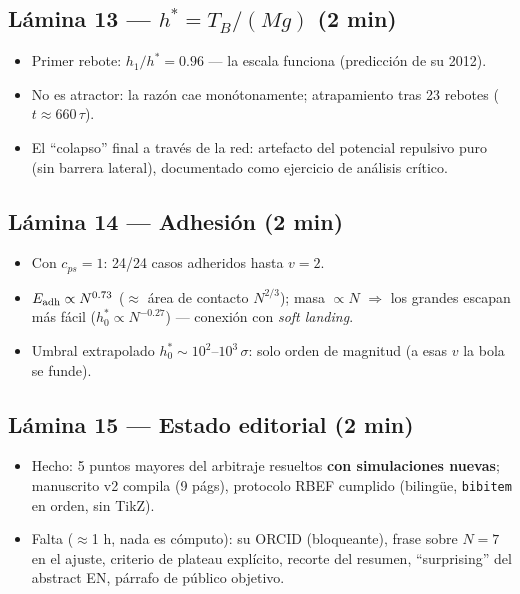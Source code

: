 \documentclass[11pt]{article}
\newcommand{\clave}[1]{\textcolor{red!60!black}{\textbf{#1}}}
\begin{document}
\subsection*{Lámina 13 --- $h^*=T_B/(Mg)$ (2 min)}
\begin{itemize}[leftmargin=1.4em]
    \item Primer rebote: $h_1/h^*=0.96$ --- la escala funciona
    (predicción de su 2012).
    \item No es atractor: la razón cae monótonamente; atrapamiento tras
    23 rebotes ($t\approx660\,\tau$).
    \item El ``colapso'' final a través de la red: artefacto del
    potencial repulsivo puro (sin barrera lateral), documentado como
    ejercicio de análisis crítico.
\end{itemize}

\subsection*{Lámina 14 --- Adhesión (2 min)}
\begin{itemize}[leftmargin=1.4em]
    \item Con $c_{ps}=1$: 24/24 casos adheridos hasta $v=2$.
    \item $E_{\rm adh}\propto N^{0.73}$ ($\approx$ área de contacto
    $N^{2/3}$); masa $\propto N$ $\Rightarrow$ los grandes escapan más
    fácil ($h_0^*\propto N^{-0.27}$) --- conexión con \emph{soft
    landing}.
    \item Umbral extrapolado $h_0^*\sim10^2$--$10^3\,\sigma$: solo orden
    de magnitud (a esas $v$ la bola se funde).
\end{itemize}

\subsection*{Lámina 15 --- Estado editorial (2 min)}
\begin{itemize}[leftmargin=1.4em]
    \item Hecho: 5 puntos mayores del arbitraje resueltos \clave{con
    simulaciones nuevas}; manuscrito v2 compila (9 págs), protocolo RBEF
    cumplido (bilingüe, \texttt{bibitem} en orden, sin TikZ).
    \item Falta ($\approx$1 h, nada es cómputo): su ORCID (bloqueante),
    frase sobre $N=7$ en el ajuste, criterio de plateau explícito,
    recorte del resumen, ``surprising'' del abstract EN, párrafo de
    público objetivo.
\end{itemize}
\end{document}
